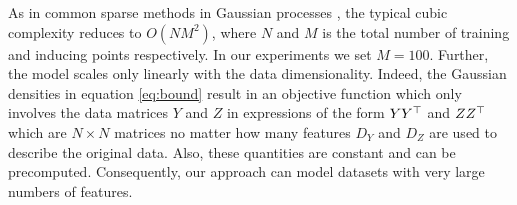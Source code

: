 As in common sparse methods in Gaussian processes
\cite{Titsias:variational09}, the typical cubic complexity reduces to
$O(NM^2)$, where $N$ and $M$ is the total number of training and
inducing points respectively. 
In our experiments we set $M=100$.
 Further, the model scales only
linearly with the data dimensionality. Indeed, the Gaussian densities
in equation \eqref{eq:bound} result in an objective function which
only involves the data matrices $Y$ and $Z$ in expressions of the form
$Y Y^{\top}$ and $Z Z^{\top}$ which are $N \times N$ matrices no matter how
many features $D_Y$ and $D_Z$ are used to describe the original
data. Also, these quantities are constant and can be
precomputed. Consequently, our approach can model datasets with
very large numbers of features.


